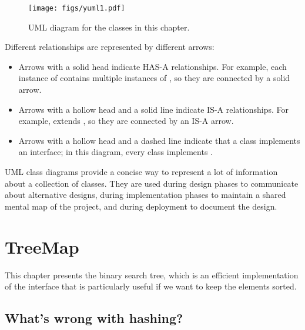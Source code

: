 \documentclass[12pt]{book}
\theoremstyle{exercise}
\begin{document}
\begin{figure}
\centering
\texttt{[image: figs/yuml1.pdf]}
\caption{UML diagram for the classes in this chapter.}
\label{fig-uml}
\end{figure}


Different relationships are represented by different arrows:

\begin{itemize}

\item
  Arrows with a solid head indicate HAS-A relationships. For example,
  each instance of  contains multiple instances of
  , so they are connected by a solid arrow.

\item
  Arrows with a hollow head and a solid line indicate IS-A
  relationships. For example,  extends
  , so they are connected by an IS-A arrow.

\item
  Arrows with a hollow head and a dashed line indicate that a class
  implements an interface; in this diagram, every class implements
  .

\end{itemize}

UML class diagrams provide a concise way to represent a lot of
information about a collection of classes. They are used during design
phases to communicate about alternative designs, during implementation
phases to maintain a shared mental map of the project, and during
deployment to document the design.


\chapter{TreeMap}


This chapter presents the binary search tree, which is an efficient
implementation of the  interface that is particularly useful
if we want to keep the elements sorted.


\section{What's wrong with hashing?}
\end{document}
